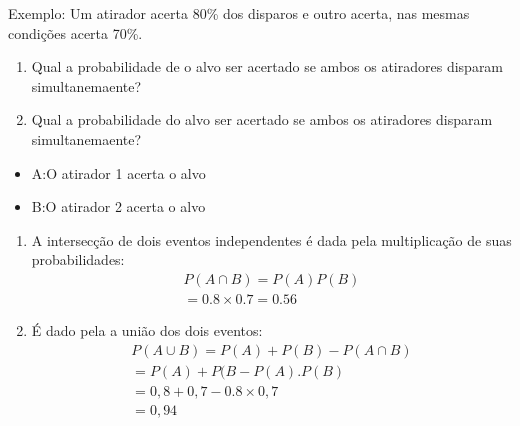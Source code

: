 \documentclass[11pt,a4paper]{article}
\begin{document}
Exemplo: Um atirador acerta 80\% dos disparos e outro acerta, nas mesmas condições
acerta 70\%.
\begin{enumerate}[label=(\alph*)]
  \item Qual a probabilidade de o alvo ser acertado se ambos os atiradores disparam 
    simultanemaente?
  \item Qual a probabilidade do alvo ser acertado se ambos os atiradores disparam 
    simultanemaente?
\end{enumerate}
\begin{itemize}
  \item A:\@ O atirador 1 acerta o alvo
  \item B:\@ O atirador 2 acerta o alvo
\end{itemize}
\begin{enumerate}[label=(\alph*)]
  \item  A intersecção de dois eventos independentes é dada pela multiplicação de suas probabilidades:
    \begin{align}
      P(A \cap B)= P(A)P(B)\\
      =0.8 \times 0.7= 0.56
    \end{align}
  \item É dado pela a união dos dois eventos:
    \begin{align}
      P(A \cup B)= P(A)+ P(B)- P( A \cap B )\\
      = P(A) + P(B- P(A).P(B)\\
      = 0,8+0,7 - 0.8\times 0,7\\
      =0,94
    \end{align}
\end{enumerate}
\end{document}
